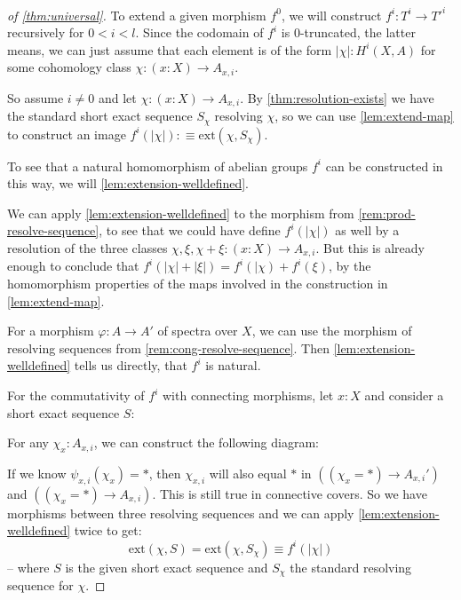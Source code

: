 \begin{proof}[of \cref{thm:universal}]
  To extend a given morphism $f^0$, 
  we will construct $f^i:T^i\to T'^i$ recursively for $0<i<l$.
  Since the codomain of $f^i$ is 0-truncated, the latter means, we can just assume that each element is of the form $|\chi|:H^i(X,A)$
  for some cohomology class $\chi:(x:X)\to A_{x,i}$.

  So assume $i\neq 0$ and let $\chi:(x:X)\to A_{x,i}$.
  By \cref{thm:resolution-exists} we have the standard short exact sequence $S_\chi$ resolving $\chi$,
  so we can use \cref{lem:extend-map} to construct an image $f^i(|\chi|):\equiv \mathrm{ext}(\chi,S_\chi)$.
  
  To see that a natural homomorphism of abelian groups $f^i$ can be constructed in this way,
  we will \cref{lem:extension-welldefined}.

  We can apply \cref{lem:extension-welldefined} to the morphism from \cref{rem:prod-resolve-sequence},
  to see that we could have define $f^i(|\chi|)$ as well by
  a resolution of the three classes $\chi, \xi, \chi+\xi:(x:X)\to A_{x,i}$.
  But this is already enough to conclude that $f^i(|\chi|+|\xi|)=f^i(|\chi)+f^i(\xi)$, by the homomorphism properties of the maps involved in the construction in \cref{lem:extend-map}.

  For a morphism $\varphi:A\to A'$ of spectra over $X$,
  we can use the morphism of resolving sequences from \cref{rem:cong-resolve-sequence}.
  Then \cref{lem:extension-welldefined} tells us directly, that $f^i$ is natural.
  
  For the commutativity of $f^i$ with connecting morphisms, let $x:X$ and consider a short exact sequence $S$:
  \begin{center}
  \end{center}
  For any $\chi_x:A_{x,i }$, we can construct the following diagram:
  \begin{center}
  \end{center}
  If we know $\psi_{x,i}(\chi_{x})=\ast$, then $\chi_{x,i}$ will also equal $\ast$ in $\left((\chi_{x}=\ast)\to A_{x,i}'\right)$ and $\left((\chi_{x}=\ast)\to A_{x,i}\right)$.
  This is still true in connective covers.
  So we have morphisms between three resolving sequences and we
  can apply \cref{lem:extension-welldefined} twice to get:
  \[ \mathrm{ext}(\chi,S)=\mathrm{ext}(\chi,S_\chi)\equiv f^i(|\chi|)\]
  -- where $S$ is the given short exact sequence and $S_\chi$ the standard resolving sequence for $\chi$.


\end{proof}
